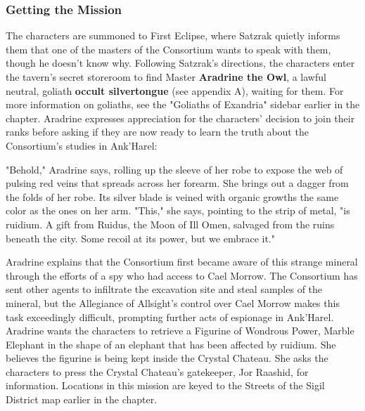 \documentclass[10pt,a4,twoside,twocolumn,openany,nodeprecatedcode]{dndbook}
\begin{document}
\subsubsection{Getting the Mission}
The characters are summoned to First Eclipse, where Satzrak quietly informs them that one of the masters of the Consortium wants to speak with them, though he doesn't know why. Following Satzrak's directions, the characters enter the tavern's secret storeroom to find Master \textbf{Aradrine the Owl}, a lawful neutral, goliath \textbf{occult silvertongue} (see appendix A), waiting for them. For more information on goliaths, see the "Goliaths of Exandria" sidebar earlier in the chapter.
Aradrine expresses appreciation for the characters' decision to join their ranks before asking if they are now ready to learn the truth about the Consortium's studies in Ank'Harel:
\begin{DndReadAloud}{}
"Behold," Aradrine says, rolling up the sleeve of her robe to expose the web of pulsing red veins that spreads across her forearm. She brings out a dagger from the folds of her robe. Its silver blade is veined with organic growths the same color as the ones on her arm. "This," she says, pointing to the strip of metal, "is ruidium. A gift from Ruidus, the Moon of Ill Omen, salvaged from the ruins beneath the city. Some recoil at its power, but we embrace it."
\end{DndReadAloud}

Aradrine explains that the Consortium first became aware of this strange mineral through the efforts of a spy who had access to Cael Morrow. The Consortium has sent other agents to infiltrate the excavation site and steal samples of the mineral, but the Allegiance of Allsight's control over Cael Morrow makes this task exceedingly difficult, prompting further acts of espionage in Ank'Harel.
Aradrine wants the characters to retrieve a Figurine of Wondrous Power, Marble Elephant in the shape of an elephant that has been affected by ruidium. She believes the figurine is being kept inside the Crystal Chateau. She asks the characters to press the Crystal Chateau's gatekeeper, Jor Raashid, for information.
Locations in this mission are keyed to the Streets of the Sigil District map earlier in the chapter.
\end{document}
